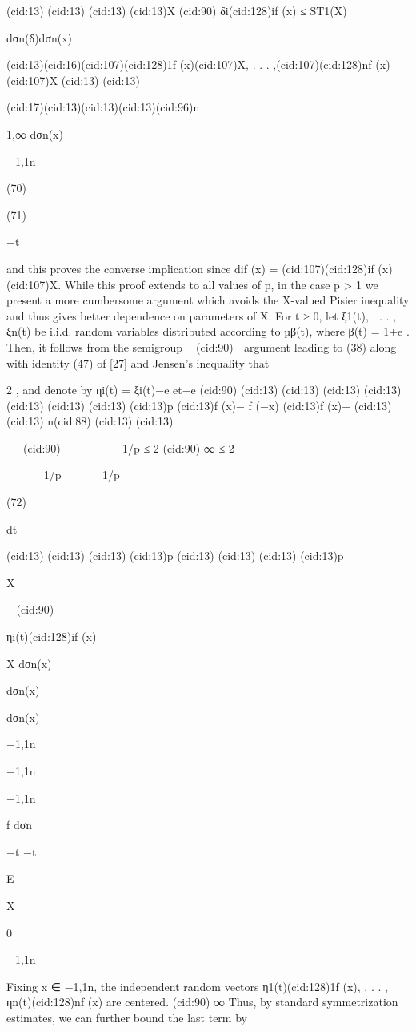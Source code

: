 {(cid:13)
(cid:13)
(cid:13)
(cid:13)X
(cid:90)
δi(cid:128)if (x)
≤ ST1(X)

dσn(δ)dσn(x)

(cid:13)(cid:16)(cid:107)(cid:128)1f (x)(cid:107)X, . . . ,(cid:107)(cid:128)nf (x)(cid:107)X
(cid:13)
(cid:13)

(cid:17)(cid:13)(cid:13)(cid:13)(cid:96)n

1,∞ dσn(x)

{−1,1}n

(70)

(71)

−t

and this proves the converse implication since dif (x) = (cid:107)(cid:128)if (x)(cid:107)X.
While this proof extends to all values of p, in the case p > 1 we present a more cumbersome
argument which avoids the X-valued Pisier inequality and thus gives better dependence on
parameters of X. For t ≥ 0, let ξ1(t), . . . , ξn(t) be i.i.d. random variables distributed according
to µβ(t), where β(t) = 1+e
. Then, it follows from the semigroup

(cid:90)

argument leading to (38) along with identity (47) of [27] and Jensen’s inequality that




2 , and denote by ηi(t) = ξi(t)−e
et−e
(cid:90)
(cid:13)
(cid:13)
(cid:13)
(cid:13)
(cid:13)
(cid:13)
(cid:13)
(cid:13)p
(cid:13)f (x)− f (−x)
(cid:13)f (x)−
(cid:13)
(cid:13) n(cid:88)
(cid:13)
(cid:13)



(cid:90)








1/p ≤ 2
(cid:90) ∞
≤ 2






1/p





1/p

(72)

dt

(cid:13)
(cid:13)
(cid:13)
(cid:13)p
(cid:13)
(cid:13)
(cid:13)
(cid:13)p

X


(cid:90)





ηi(t)(cid:128)if (x)

X dσn(x)

dσn(x)

dσn(x)

{−1,1}n

{−1,1}n

{−1,1}n

f dσn

−t
−t

E

X

0

{−1,1}n

Fixing x ∈ {−1,1}n, the independent random vectors η1(t)(cid:128)1f (x), . . . , ηn(t)(cid:128)nf (x) are centered.
(cid:90) ∞
Thus, by standard symmetrization estimates, we can further bound the last term by

}
